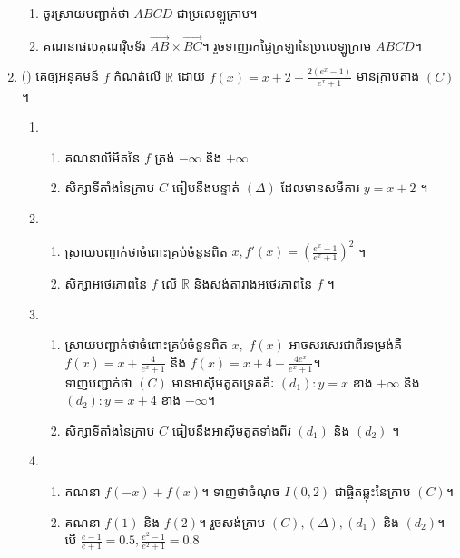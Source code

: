 \documentclass{officialexam}
\begin{document}
\begin{enumerate}[m]
	\begin{enumerate}[k]
		\item ចូរស្រាយបញ្ជាក់ថា $ABCD$ ជាប្រលេឡូក្រាម។
		\item គណនាផលគុណវុិចទ័រ $\overrightarrow{AB}\times\overrightarrow{BC}$។ រួចទាញរកផ្ទៃក្រឡានៃប្រលេឡូក្រាម $ABCD$។
	\end{enumerate}
	\item {\color{khtug}()} គេឲ្យអនុគមន៍ $f$ កំណត់លើ $\mathbb{R}$ ដោយ $f(x)=x+2-\frac{2\left(e^x-1\right)}{e^x+1}$
	មានក្រាបតាង $\left(C\right)$។
	\begin{enumerate}[1]
		\item \begin{enumerate}[k]
			\item គណនាលីមីតនៃ $f$ ត្រង់ $-\infty$ និង $+\infty$
			\item សិក្សាទីតាំងនៃក្រាប $C$ ធៀបនឹងបន្ទាត់ $\left(\Delta\right)$ ដែលមានសមីការ $y=x+2$ ។
		\end{enumerate}
		\item \begin{enumerate}[k]
			\item ស្រាយបញ្ចាក់ថាចំពោះគ្រប់ចំនួនពិត $x, f'(x)=\left(\frac{e^x-1}{e^x+1}\right)^2$ ។
			\item សិក្សាអថេរភាពនៃ $f$ លើ $\mathbb{R}$ និងសង់តារាងអថេរភាពនៃ $f$ ។
		\end{enumerate}
		\item \begin{enumerate}[k]
			\item ស្រាយបញ្ជាក់ថា​ចំពោះគ្រប់ចំនួនពិត $x,$ $f(x)$ អាចសរសេរជាពីរទម្រង់គឺ $f(x)=x+\frac{4}{e^x+1}$ និង $f(x)=x+4-\frac{4e^x}{e^x+1}$។\\
			ទាញបញ្ជាក់ថា $\left(C\right)$ មានអាសុីមតូតទ្រេតគឺៈ $\left(d_1\right):y=x$ ខាង $+\infty$ និង $\left(d_2\right):y=x+4$ ខាង $-\infty$។
			\item សិក្សាទីតាំងនៃក្រាប $C$ ធៀបនឹងអាសុីមតូតទាំងពីរ $\left(d_1\right)$ និង $\left(d_2\right)$ ។
		\end{enumerate}
		\item \begin{enumerate}[k]
			\item គណនា $f(-x)+f(x)$។ ទាញថាចំណុច $I\left(0,2\right)$ ជាផ្ចិតឆ្លុះនៃក្រាប $\left(C\right)$។
			\item គណនា $f(1)$ និង $f(2)$។ រួចសង់ក្រាប $\left(C\right),\left(\Delta\right),\left(d_1\right)$ និង $\left(d_2\right)$។ បើ $\frac{e-1}{e+1}=0.5,\frac{e^2-1}{e^2+1}=0.8$
		\end{enumerate}
	\end{enumerate}
\end{enumerate}
\end{document}
